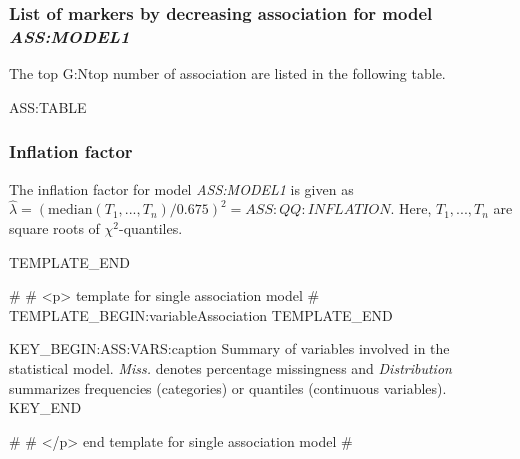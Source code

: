 \subsubsection{List of markers by decreasing association for model \emph{ASS:MODEL1}}

The top G:Ntop number of association are listed in the following table.

ASS:TABLE

\subsubsection{Inflation factor}

The inflation factor for model \emph{ASS:MODEL1} is given as $\hat \lambda = (\mathrm{median}(T_1, ..., T_n)/0.675)^2 = ASS:QQ:INFLATION$. Here, $T_1, ..., T_n$ are square roots of $\chi^2$-quantiles.

TEMPLATE_END

#
#	<p> template for single association model
#
TEMPLATE_BEGIN:variableAssociation
TEMPLATE_END

KEY_BEGIN:ASS:VARS:caption
Summary of variables involved in the statistical model. {\it Miss.} denotes percentage missingness and {\it Distribution} summarizes frequencies (categories) or quantiles (continuous variables).
KEY_END

#
#	</p> end template for single association model
#
